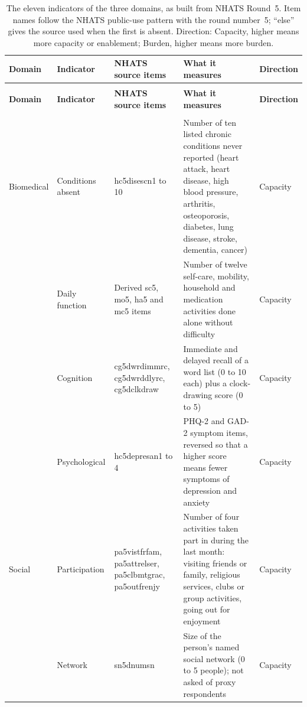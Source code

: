{\footnotesize
\renewcommand{\arraystretch}{1.15}
\begin{longtable}{>{\raggedright\arraybackslash}p{1.5cm} >{\raggedright\arraybackslash}p{2.1cm} >{\raggedright\arraybackslash}p{3.5cm} >{\raggedright\arraybackslash}p{4.4cm} >{\raggedright\arraybackslash}p{1.5cm}}
\caption[The eleven indicators of the three domains]{The eleven indicators of the three domains, as built from NHATS Round~5. Item names follow the NHATS public-use pattern with the round number~5; ``else'' gives the source used when the first is absent. Direction: Capacity, higher means more capacity or enablement; Burden, higher means more burden.}\label{tab:methods-indicators}\\
\toprule
\textbf{Domain} & \textbf{Indicator} & \textbf{NHATS source items} & \textbf{What it measures} & \textbf{Direction} \\
\midrule
\endfirsthead
\multicolumn{5}{@{}l}{\textit{Continued from the previous page}}\\
\toprule
\textbf{Domain} & \textbf{Indicator} & \textbf{NHATS source items} & \textbf{What it measures} & \textbf{Direction} \\
\midrule
\endhead
\midrule
\multicolumn{5}{@{}r}{\textit{Continued on the next page}}\\
\endfoot
\endlastfoot
Biomedical & Conditions absent & hc5disescn1 to 10 & Number of ten listed chronic conditions never reported (heart attack, heart disease, high blood pressure, arthritis, osteoporosis, diabetes, lung disease, stroke, dementia, cancer) & Capacity \\
 & Daily function & Derived sc5, mo5, ha5 and mc5 items & Number of twelve self-care, mobility, household and medication activities done alone without difficulty & Capacity \\
 & Cognition & cg5dwrdimmrc, cg5dwrddlyrc, cg5dclkdraw & Immediate and delayed recall of a word list (0 to 10 each) plus a clock-drawing score (0 to 5) & Capacity \\
 & Psychological & hc5depresan1 to 4 & PHQ-2 and GAD-2 symptom items, reversed so that a higher score means fewer symptoms of depression and anxiety & Capacity \\
\midrule
Social & Participation & pa5vistfrfam, pa5attrelser, pa5clbmtgrac, pa5outfrenjy & Number of four activities taken part in during the last month: visiting friends or family, religious services, clubs or group activities, going out for enjoyment & Capacity \\
 & Network & sn5dnumsn & Size of the person's named social network (0 to 5 people); not asked of proxy respondents & Capacity \\

\end{longtable}}
